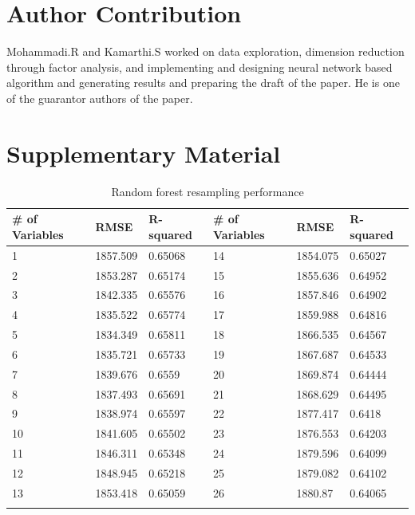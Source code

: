 \documentclass[preprint,12pt]{elsarticle}
\begin{document}
\section{Author Contribution}
Mohammadi.R and Kamarthi.S worked on data exploration, dimension reduction through factor analysis, and implementing and designing neural network based algorithm and generating results and preparing the draft of the paper. He is one of the guarantor authors of the paper.




\newpage
\section{Supplementary Material}


\begin{table}[H]
\centering
\caption{Random forest resampling performance}
\begin{tabular}{llllll}
\hline
\# of Variables & RMSE     & R-squared & \# of Variables & RMSE     & R-squared \\
\hline
1               & 1857.509 & 0.65068   & 14              & 1854.075 & 0.65027   \\
2               & 1853.287 & 0.65174   & 15              & 1855.636 & 0.64952   \\
3               & 1842.335 & 0.65576   & 16              & 1857.846 & 0.64902   \\
4               & 1835.522 & 0.65774   & 17              & 1859.988 & 0.64816   \\
5               & 1834.349 & 0.65811   & 18              & 1866.535 & 0.64567   \\
6               & 1835.721 & 0.65733   & 19              & 1867.687 & 0.64533   \\
7               & 1839.676 & 0.6559    & 20              & 1869.874 & 0.64444   \\
8               & 1837.493 & 0.65691   & 21              & 1868.629 & 0.64495   \\
9               & 1838.974 & 0.65597   & 22              & 1877.417 & 0.6418    \\
10              & 1841.605 & 0.65502   & 23              & 1876.553 & 0.64203   \\
11              & 1846.311 & 0.65348   & 24              & 1879.596 & 0.64099   \\
12              & 1848.945 & 0.65218   & 25              & 1879.082 & 0.64102   \\
13              & 1853.418 & 0.65059   & 26              & 1880.87  & 0.64065 \\
\hline
\label{tab:RF_RMSE}
\end{tabular}
\end{table}
\end{document}
